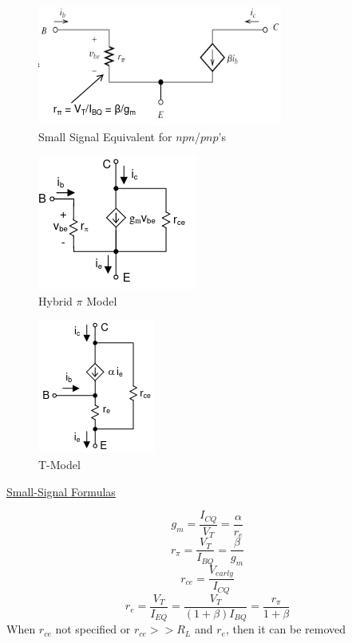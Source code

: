 \documentclass[12pt]{article}
\begin{document}
  \vspace{-25pt}

  \begin{figure}[H]
    \centering
    \includegraphics[width=.6\textwidth]{Figures/SmallSignal}
    \caption{Small Signal Equivalent for $npn$/$pnp$'s}
    \label{fig:7}
  \end{figure}

  \begin{multicols}{2}

    \begin{figure}[H]
      \centering
      \includegraphics[height=.2\textheight]{Figures/HybridPi}
      \caption{Hybrid $\pi$ Model}
      \label{fig:8}
    \end{figure}

    \begin{figure}[H]
      \centering
      \includegraphics[height=.2\textheight]{Figures/TModel}
      \caption{T-Model}
      \label{fig:9}
    \end{figure}

  \end{multicols}

  \begin{multicols}{2}

    \begin{center}
      \underline{Small-Signal Formulas}
    \end{center}
    $$g_m=\frac{I_{CQ}}{V_T}=\frac{\alpha}{r_e}$$
    $$r_{\pi}=\frac{V_T}{I_{BQ}}=\frac{\beta}{g_m}$$
    $$r_{ce}=\frac{V_{early}}{I_{CQ}}$$
    $$r_{e}=\frac{V_T}{I_{EQ}}=\frac{V_T}{(1+\beta)I_{BQ}}=\frac{r_{\pi}}{1+\beta}$$
    When $r_{ce}$ not specified or $r_{ce}>>R_L$ and $r_e$, then it can be removed

  \end{multicols}
\end{document}
